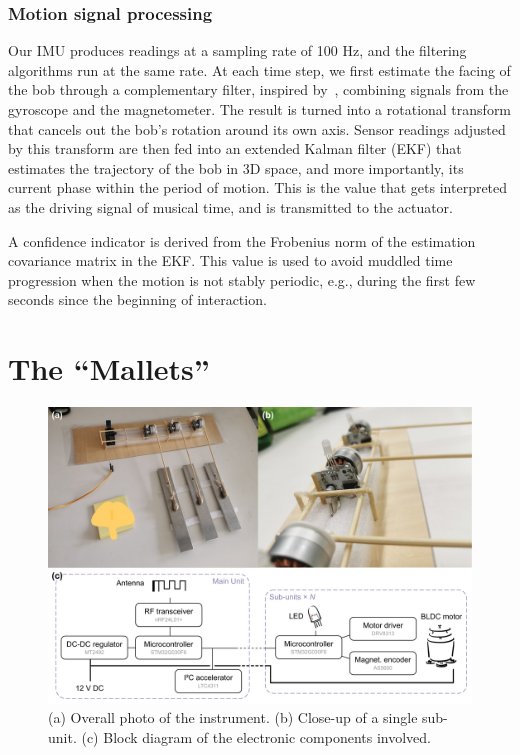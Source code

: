 \documentclass{nime-alternate} %
\begin{document}
\subsubsection{Motion signal processing}
Our IMU produces readings at a sampling rate of 100 Hz, and the filtering algorithms run at the same rate. At each time step, we first estimate the facing of the bob through a complementary filter, inspired by~\cite{Min_Complementary}, combining signals from the gyroscope and the magnetometer. The result is turned into a rotational transform that cancels out the bob's rotation around its own axis. Sensor readings adjusted by this transform are then fed into an extended Kalman filter (EKF) that estimates the trajectory of the bob in 3D space, and more importantly, its current phase within the period of motion. This is the value that gets interpreted as the driving signal of musical time, and is transmitted to the actuator.

A confidence indicator is derived from the Frobenius norm of the estimation covariance matrix in the EKF. This value is used to avoid muddled time progression when the motion is not stably periodic, e.g., during the first few seconds since the beginning of interaction.

\section{The ``Mallets''}

\begin{figure}[bh!]
  \centering
  \includegraphics[width=1\textwidth]{Mw_Mallet.pdf}
  \caption{(a) Overall photo of the instrument. (b) Close-up of a single sub-unit. (c) Block diagram of the electronic components involved.}
  \label{fig:MalletConstruction}
\end{figure}
\end{document}

